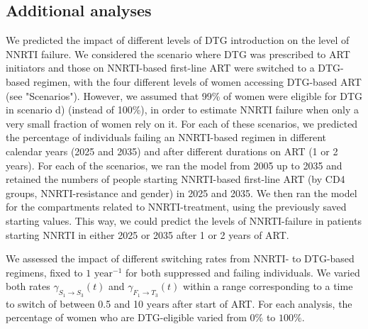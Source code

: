 \documentclass[10pt,letterpaper]{article}
\begin{document}
\subsection*{Additional analyses}
We predicted the impact of different levels of DTG introduction on the level of NNRTI failure. We considered the scenario where DTG was prescribed to ART initiators and those on NNRTI-based first-line ART were switched to a DTG-based regimen, with the four different levels of women accessing DTG-based ART (see "Scenarios"). However, we assumed that 99\% of women were eligible for DTG in scenario d) (instead of 100\%), in order to estimate NNRTI failure when only a very small fraction of women rely on it. For each of these scenarios, we predicted the percentage of individuals failing an NNRTI-based regimen in different calendar years (2025 and 2035) and after different durations on ART (1 or 2 years). For each of the scenarios, we ran the model from 2005 up to 2035 and retained the numbers of people starting NNRTI-based first-line ART (by CD4 groups, NNRTI-resistance and gender) in 2025 and 2035. We then ran the model for the compartments related to NNRTI-treatment, using the previously saved starting values. This way, we could predict the levels of NNRTI-failure in patients starting NNRTI in either 2025 or 2035 after 1 or 2 years of ART.

We assessed the impact of different switching rates from NNRTI- to DTG-based regimens, fixed to $1 \text{ year}^{-1}$ for both suppressed and failing individuals. We varied both rates $\gamma_{S_1\rightarrow S_3}^{}(t)$ and $\gamma_{F_1\rightarrow T_3}^{}(t)$ within a range corresponding to a time to switch of between 0.5 and 10 $\text{years}$  after start of ART. For each analysis, the percentage of women who are DTG-eligible varied from $0\%$ to $100\%$.
\end{document}
